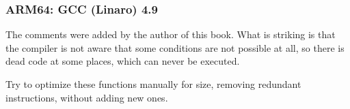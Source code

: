 \subsubsection{ARM64: \Optimizing GCC (Linaro) 4.9}





The comments were added by the author of this book.
What is striking is that the compiler is not aware that some conditions are not possible at all,
so there is dead code at some places, which can never be executed.

\myparagraph{\Exercise}

Try to optimize these functions manually for size, removing redundant instructions, without adding new ones.

